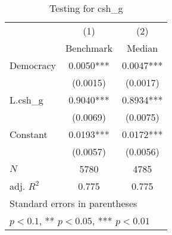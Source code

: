 \begin{table}[htbp]\centering
\def\sym#1{\ifmmode^{#1}\else\(^{#1}\)\fi}
\caption{Testing for csh\_g \label{tab:regression3}}
\begin{tabular}{l*{2}{c}}
\hline\hline
            &\multicolumn{1}{c}{(1)}&\multicolumn{1}{c}{(2)}\\
            &\multicolumn{1}{c}{Benchmark}&\multicolumn{1}{c}{Median}\\
\hline
Democracy   &      0.0050***&      0.0047***\\
            &    (0.0015)   &    (0.0017)   \\
[1em]
L.csh\_g     &      0.9040***&      0.8934***\\
            &    (0.0069)   &    (0.0075)   \\
[1em]
Constant    &      0.0193***&      0.0172***\\
            &    (0.0057)   &    (0.0056)   \\
\hline
\(N\)       &        5780   &        4785   \\
adj. \(R^{2}\)&       0.775   &       0.775   \\
\hline\hline
\multicolumn{3}{l}{\footnotesize Standard errors in parentheses}\\
\multicolumn{3}{l}{\footnotesize * \(p<0.1\), ** \(p<0.05\), *** \(p<0.01\)}\\
\end{tabular}
\end{table}
